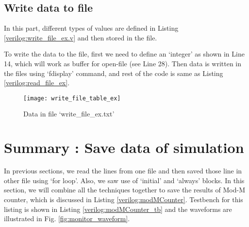 \subsection{Write data to file}

In this part, different types of values are defined in Listing \ref{verilog:write_file_ex.v} and then stored in the file. 

\begin{explanation}
	To write the data to the file, first we need to define an `integer' as shown in Line 14, which will work as buffer for open-file (see Line 28). Then data is written in the files using `fdisplay' command, and rest of the code is same as Listing  \ref{verilog:read_file_ex}.  
\end{explanation}
%
%


%
\begin{figure}[!h]
	\centering
	\texttt{[image: write\_file\_table\_ex]}
	\caption{Data in file  `write\_file\_ex.txt'}
	\label{fig:write_file_table_ex}
\end{figure}

\section{Summary : Save data of simulation}
In previous sections, we read the lines from one file and then saved those line in other file using `for loop'. Also, we saw use of `initial' and `always' blocks. In this section, we will combine all the techniques together to save the results of Mod-M counter, which is discussed in Listing \ref{verilog:modMCounter}. Testbench for this listing is shown in Listing \ref{verilog:modMCounter_tb} and the waveforms are illustrated in Fig. \ref{fig:monitor_waveform}.

